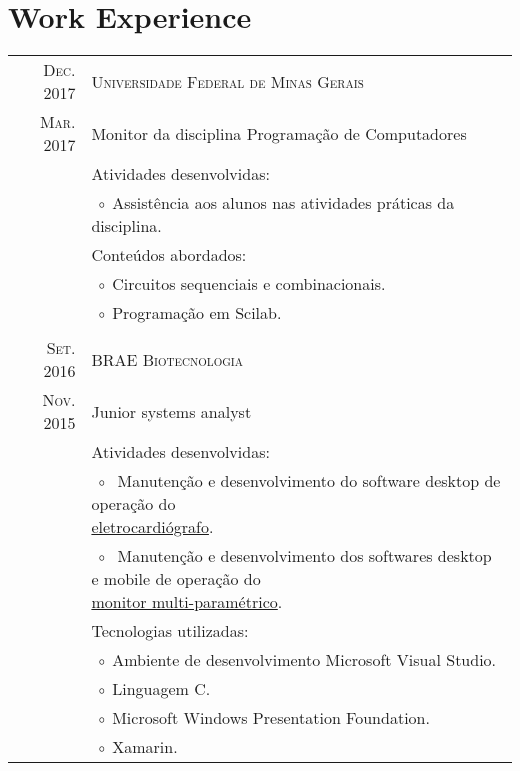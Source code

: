 \documentclass[a4paper,10pt]{article}
\newcommand{\tabitem}{$\;\circ\;$}
\renewcommand\#{\protect\scalebox{0.8}{\protect\raisebox{0.4ex}{\char"0023}}}
\begin{document}
\section{Work Experience}
\begin{tabular}{r|p{12.3cm}}
  \textsc{Dec. 2017} & \textsc{Universidade Federal de Minas Gerais} \\
  \textsc{Mar. 2017} & Monitor da disciplina Programação de Computadores \\[5pt]
  & Atividades desenvolvidas: \\
  & \tabitem Assistência aos alunos nas atividades práticas da disciplina. \\
  & Conteúdos abordados: \\
  & \tabitem Circuitos sequenciais e combinacionais. \\
  & \tabitem Programação em Scilab. \\
  
  \multicolumn{2}{c}{} \\
  \textsc{Set. 2016} & \textsc{BRAE Biotecnologia} \\
  \textsc{Nov. 2015} & Junior systems analyst \\[5pt]
  & Atividades desenvolvidas: \\
  & \tabitem \makecell[lt] {
              Manutenção e desenvolvimento do software desktop de operação do \\
              \href{http://www.ferox.vet.br/pt-br/produtos/ecg-veterinario.aspx}{eletrocardiógrafo}.
             }\\
  & \tabitem \makecell[lt]{
              Manutenção e desenvolvimento dos softwares desktop e mobile de operação do \\
              \href{http://www.ferox.com.br/pt-br/produtos/monitor-multiparametrico/monitorfx4000.aspx}{monitor multi-paramétrico}.
             }\\[-3pt]
  & Tecnologias utilizadas: \\
  & \tabitem Ambiente de desenvolvimento Microsoft Visual Studio. \\
  & \tabitem Linguagem C\#. \\
  & \tabitem Microsoft Windows Presentation Foundation. \\
  & \tabitem Xamarin. \\
  

\end{tabular}
\end{document}
